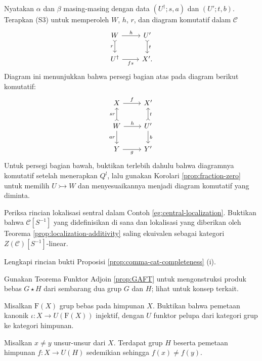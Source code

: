 \begin{Exercises}
	\begin{hint}
		Nyatakan $\alpha$ dan $\beta$ masing-masing dengan data
		$(U^\dagger;s,a)$ dan $(U';t,b)$. Terapkan (S3) untuk memperoleh $W$,
		$h$, $r$, dan diagram komutatif dalam $\mathcal{C}$
		\[\begin{tikzcd}
			W \arrow[r, "h"] \arrow[rightarrowtail, d, "r"'] & U' \arrow[rightarrowtail, d, "{t}"] \\
			U^\dagger \arrow[r, "{fs}"'] & X' .
		\end{tikzcd}\]
		Diagram ini menunjukkan bahwa persegi bagian atas pada diagram berikut
		komutatif:
		\[\begin{tikzcd}
			X \arrow[r, "f"] & X' \\
			W \arrow[rightarrowtail, u, "{sr}"] \arrow[r, "h"] \arrow[d, "{ar}"'] & U' \arrow[rightarrowtail, u, "{t}"'] \arrow[d, "{b}"] \\
			Y \arrow[r, "g"'] & Y'
		\end{tikzcd}\]
		Untuk persegi bagian bawah, buktikan terlebih dahulu bahwa diagramnya
		komutatif setelah menerapkan $Q^l$, lalu gunakan Korolari
		\ref{prop:fraction-zero} untuk memilih $U\rightarrowtail W$ dan
		menyesuaikannya menjadi diagram komutatif yang diminta.
	\end{hint}

	\item Periksa rincian lokalisasi sentral dalam Contoh
	\ref{eg:central-localization}. Buktikan bahwa $\mathcal{C}[S^{-1}]$ yang
	didefinisikan di sana dan lokalisasi yang diberikan oleh Teorema
	\ref{prop:localization-additivity} saling ekuivalen sebagai kategori
	$Z(\mathcal{C})[S^{-1}]$-linear.

	\item Lengkapi rincian bukti Proposisi
	\ref{prop:comma-cat-completeness} (i).

	\item Gunakan Teorema Funktor Adjoin \ref{prop:GAFT} untuk mengonstruksi
	produk bebas $G\star H$ dari sembarang dua grup $G$ dan $H$; lihat
	\cite[Definisi 4.8.9]{Li1} untuk konsep terkait.

	\item Misalkan $\mathrm{F}(X)$ grup bebas pada himpunan $X$. Buktikan bahwa
	pemetaan kanonik $\iota:X\to U(\mathrm{F}(X))$ injektif, dengan $U$
	funktor pelupa dari kategori grup ke kategori himpunan.
	\begin{hint}
		Misalkan $x\neq y$ unsur-unsur dari $X$. Terdapat grup $H$ beserta
		pemetaan himpunan $f:X\to U(H)$ sedemikian sehingga $f(x)\neq f(y)$.
	\end{hint}


\end{Exercises}
